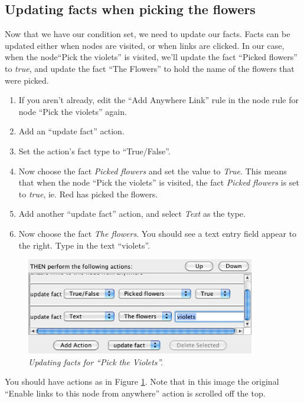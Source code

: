 \documentclass{article}
\begin{document}
\subsection{Updating facts when picking the flowers}

Now that we have our condition set, we need to update our facts. Facts can be
updated either when nodes are visited, or when links are clicked. In our case,
when the node``Pick the violets'' is visited, we'll update the fact ``Picked
flowers'' to \textit{true}, and update the fact ``The Flowers'' to hold the name
of the flowers that were picked.

\begin{enumerate}
  \item If you aren't already, edit the ``Add Anywhere Link'' rule in the
  node rule for node ``Pick the violets'' again.
  \item Add an ``update fact'' action.
  \item Set the action's fact type to ``True/False''. 
  \item Now choose the fact \textit{Picked flowers} and set the value to
  \textit{True}. This means that when the node ``Pick the violets'' is
  visited, the fact \textit{Picked flowers} is set to \textit{true}, ie. Red
  has picked the flowers.
  \item Add another ``update fact'' action, and select \textit{Text} as the
  type.
  \item Now choose the fact \textit{The flowers}. You should see a text entry
  field appear to the right. Type in the text ``violets''.
\end{enumerate}

\begin{figure}[h]
  \centering
  \includegraphics[width=10cm]{images/hypedyn-tutorial-3-figure-11}
  \caption{\textit{Updating facts for ``Pick the Violets''.}}
  \label{fig:tut3:picktheviolets2}
\end{figure}

You should have actions as in Figure \ref{fig:tut3:picktheviolets2}. Note that
in this image the original ``Enable links to this node from anywhere'' action
is scrolled off the top.
\end{document}
